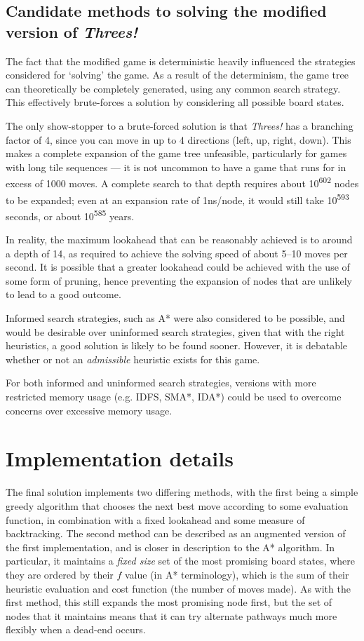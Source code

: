 \documentclass[a4paper, 11pt, titlepage]{report}
\newcommand{\ts}{\textsuperscript}
\newcommand{\threes}{\emph{Threes!}}
\begin{document}

\section{Candidate methods to solving the modified version of \threes{}}
The fact that the modified game is deterministic heavily influenced the strategies considered for `solving' the game. As a result of the determinism, the game tree can theoretically be completely generated, using any common search strategy. This effectively brute-forces a solution by considering all possible board states. 

The only show-stopper to a brute-forced solution is that \threes{} has a branching factor of 4, since you can move in up to 4 directions (left, up, right, down). This makes a complete expansion of the game tree unfeasible, particularly for games with long tile sequences --- it is not uncommon to have a game that runs for in excess of 1000 moves. A complete search to that depth requires about 10\ts{602} nodes to be expanded; even at an expansion rate of 1ns/node, it would still take 10\ts{593} seconds, or about 10\ts{585} years.  

In reality, the maximum lookahead that can be reasonably achieved is to around a depth of 14, as required to achieve the solving speed of about 5--10 moves per second. It is possible that a greater lookahead could be achieved with the use of some form of pruning, hence preventing the expansion of nodes that are unlikely to lead to a good outcome.

Informed search strategies, such as A* were also considered to be possible, and would be desirable over uninformed search strategies, given that with the right heuristics, a good solution is likely to be found sooner. However, it is debatable whether or not an \emph{admissible} heuristic exists for this game. 

For both informed and uninformed search strategies, versions with more restricted memory usage (e.g. IDFS, SMA*, IDA*) could be used to overcome concerns over excessive memory usage.

\chapter{Implementation details}
The final solution implements two differing methods, with the first being a simple greedy algorithm that chooses the next best move according to some evaluation function, in combination with a fixed lookahead and some measure of backtracking. The second method can be described as an augmented version of the first implementation, and is closer in description to the A* algorithm. In particular, it maintains a \emph{fixed size} set of the most promising board states, where they are ordered by their $f$ value (in A* terminology), which is the sum of their heuristic evaluation and cost function (the number of moves made). As with the first method, this still expands the most promising node first, but the set of nodes that it maintains means that it can try alternate pathways much more flexibly when a dead-end occurs.
\end{document}
